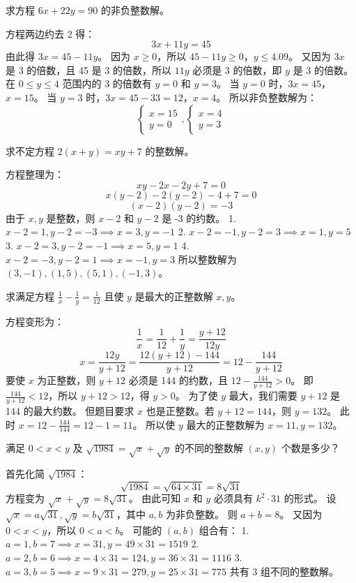 \begin{questions}
\question 求方程 $6x + 22y = 90$ 的非负整数解。
\begin{solution}
方程两边约去 2 得：
\[3x + 11y = 45\]
由此得 $3x = 45 - 11y$。
因为 $x \ge 0$，所以 $45 - 11y \ge 0$，$y \le 4.09$。
又因为 $3x$ 是 3 的倍数，且 45 是 3 的倍数，所以 $11y$ 必须是 3 的倍数，即 $y$ 是 3 的倍数。
在 $0 \le y \le 4$ 范围内的 3 的倍数有 $y = 0$ 和 $y = 3$。
当 $y = 0$ 时，$3x = 45$，$x = 15$。
当 $y = 3$ 时，$3x = 45 - 33 = 12$，$x = 4$。
所以非负整数解为：
\[
\begin{cases}
x = 15 \\
y = 0
\end{cases}, 
\begin{cases}
x = 4 \\
y = 3
\end{cases}
\]
\end{solution}

\question 求不定方程 $2(x+y) = xy + 7$ 的整数解。
\begin{solution}
方程整理为：
\[xy - 2x - 2y + 7 = 0\]
\[x(y - 2) - 2(y - 2) - 4 + 7 = 0\]
\[(x - 2)(y - 2) = -3\]
由于 $x, y$ 是整数，则 $x-2$ 和 $y-2$ 是 -3 的约数。
1. $x - 2 = 1, y - 2 = -3 \implies x = 3, y = -1$
2. $x - 2 = -1, y - 2 = 3 \implies x = 1, y = 5$
3. $x - 2 = 3, y - 2 = -1 \implies x = 5, y = 1$
4. $x - 2 = -3, y - 2 = 1 \implies x = -1, y = 3$
所以整数解为 $(3, -1), (1, 5), (5, 1), (-1, 3)$。
\end{solution}

\question 求满足方程 $\frac{1}{x} - \frac{1}{y} = \frac{1}{12}$ 且使 $y$ 是最大的正整数解 $x, y$。
\begin{solution}
方程变形为：
\[\frac{1}{x} = \frac{1}{12} + \frac{1}{y} = \frac{y + 12}{12y}\]
\[x = \frac{12y}{y + 12} = \frac{12(y + 12) - 144}{y + 12} = 12 - \frac{144}{y + 12}\]
要使 $x$ 为正整数，则 $y + 12$ 必须是 144 的约数，且 $12 - \frac{144}{y + 12} > 0$。
即 $\frac{144}{y + 12} < 12$，所以 $y + 12 > 12$，得 $y > 0$。
为了使 $y$ 最大，我们需要 $y + 12$ 是 144 的最大约数。
但题目要求 $x$ 也是正整数。若 $y + 12 = 144$，则 $y = 132$。
此时 $x = 12 - \frac{144}{144} = 12 - 1 = 11$。
所以使 $y$ 最大的正整数解为 $x = 11, y = 132$。
\end{solution}

\question 满足 $0 < x < y$ 及 $\sqrt{1984} = \sqrt{x} + \sqrt{y}$ 的不同的整数解 $(x, y)$ 个数是多少？
\begin{solution}
首先化简 $\sqrt{1984}$：
\[\sqrt{1984} = \sqrt{64 \times 31} = 8\sqrt{31}\]
方程变为 $\sqrt{x} + \sqrt{y} = 8\sqrt{31}$。
由此可知 $x$ 和 $y$ 必须具有 $k^2 \cdot 31$ 的形式。
设 $\sqrt{x} = a\sqrt{31}, \sqrt{y} = b\sqrt{31}$，其中 $a, b$ 为非负整数。
则 $a + b = 8$。
又因为 $0 < x < y$，所以 $0 < a < b$。
可能的 $(a, b)$ 组合有：
1. $a = 1, b = 7 \implies x = 31, y = 49 \times 31 = 1519$
2. $a = 2, b = 6 \implies x = 4 \times 31 = 124, y = 36 \times 31 = 1116$
3. $a = 3, b = 5 \implies x = 9 \times 31 = 279, y = 25 \times 31 = 775$
共有 3 组不同的整数解。
\end{solution}


\end{questions}
